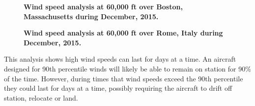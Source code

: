\begin{figure}[H]
 \begin{subfigmatrix}{2}%
 \end{subfigmatrix}
 \caption{\textbf{Wind speed analysis at 60,000 ft over Boston, Massachusetts during December, 2015.}}
 \label{f:bostonwinds}
\end{figure}

\begin{figure}[H]
 \begin{subfigmatrix}{2}%
 \end{subfigmatrix}
 \caption{\textbf{Wind speed analysis at 60,000 ft over Rome, Italy during December, 2015.}}
 \label{f:romewinds}
\end{figure}

This analysis shows high wind speeds can last for days at a time.  
An aircraft designed for 90th percentile winds will likely be able to remain on station for 90\% of the time.  
However, during times that wind speeds exceed the 90th percentile they could last for days at a time, possibly requiring the aircraft to drift off station, relocate or land. 
